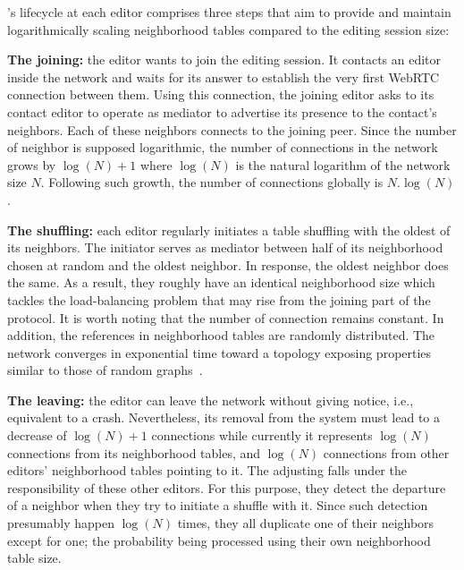\SPRAY's lifecycle at each editor comprises three steps that aim to provide and
maintain logarithmically scaling neighborhood tables compared to the editing
session size:
\begin{asparadesc}
\item [\textbf{The joining:}] the editor wants to join the editing session. It
  contacts an editor inside the network and waits for its answer to establish
  the very first WebRTC connection between them. Using this connection, the
  joining editor asks to its contact editor to operate as mediator to advertise
  its presence to the contact's neighbors. Each of these neighbors connects to
  the joining peer. Since the number of neighbor is supposed logarithmic, the
  number of connections in the network grows by $\log(N)+1$ where $\log(N)$ is
  the natural logarithm of the network size $N$. Following such growth, the
  number of connections globally is $N.\log(N)$.
\item [\textbf{The shuffling:}] each editor regularly initiates a table
  shuffling with the oldest of its neighbors. The initiator serves as mediator
  between half of its neighborhood chosen at random and the oldest neighbor. In
  response, the oldest neighbor does the same. As a result, they roughly have an
  identical neighborhood size which tackles the load-balancing problem that may
  rise from the joining part of the protocol. It is worth noting that the number
  of connection remains constant. In addition, the references in neighborhood
  tables are randomly distributed. The network converges in exponential time
  toward a topology exposing properties similar to those of random
  graphs~\cite{erdos1959random}.
\item [\textbf{The leaving:}] the editor can leave the network without giving
  notice, i.e., equivalent to a crash. Nevertheless, its removal from the system
  must lead to a decrease of $\log(N)+1$ connections while currently it
  represents $\log(N)$ connections from its neighborhood tables, and $\log(N)$
  connections from other editors' neighborhood tables pointing to it. The
  adjusting falls under the responsibility of these other editors. For this
  purpose, they detect the departure of a neighbor when they try to initiate a
  shuffle with it. Since such detection presumably happen $\log(N)$ times, they
  all duplicate one of their neighbors except for one; the probability being
  processed using their own neighborhood table size. 
\end{asparadesc}

